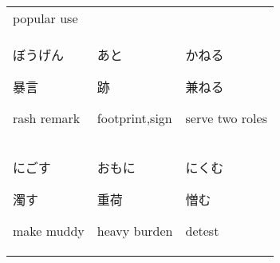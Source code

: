 \documentclass[12pt, a4j, landscape, dvipdfmx]{utarticle}
\begin{document}
\begin{minipage}[t][0pt]{\linewidth }
\begin{tabular}{||p{5.5cm}||p{5.5cm}||p{5.5cm}||}
            {\small popular use}\tabularnewline
            \hhline{|:=::=::=:|} \rule{0pt}{3ex}
            \hspace*{-.4cm} {\LARGE ぼうげん}\newline
            \rule{0pt}{3ex} \hspace*{.4cm} {\small
            暴言}\newline \rule{0pt}{3ex} \hspace*{.425cm}
            {\small rash remark}&\rule{0pt}{3ex}
            \hspace*{-.4cm} {\LARGE あと}\newline
            \rule{0pt}{3ex} \hspace*{.4cm} {\small
            跡}\newline \rule{0pt}{3ex} \hspace*{.425cm}
            {\small footprint,sign}&\rule{0pt}{3ex}
            \hspace*{-.4cm} {\LARGE かねる}\newline
            \rule{0pt}{3ex} \hspace*{.4cm} {\small
            兼ねる}\newline \rule{0pt}{3ex} \hspace*{.425cm}
            {\small serve two roles}\tabularnewline
            \hhline{|:=::=::=:|} \rule{0pt}{3ex}
            \hspace*{-.4cm} {\LARGE にごす}\newline
            \rule{0pt}{3ex} \hspace*{.4cm} {\small
            濁す}\newline \rule{0pt}{3ex} \hspace*{.425cm}
            {\small make muddy}&\rule{0pt}{3ex}
            \hspace*{-.4cm} {\LARGE おもに}\newline
            \rule{0pt}{3ex} \hspace*{.4cm} {\small
            重荷}\newline \rule{0pt}{3ex} \hspace*{.425cm}
            {\small heavy burden}&\rule{0pt}{3ex}
            \hspace*{-.4cm} {\LARGE にくむ}\newline
            \rule{0pt}{3ex} \hspace*{.4cm} {\small
            憎む}\newline \rule{0pt}{3ex} \hspace*{.425cm}
            {\small detest}\tabularnewline

\end{tabular}
\end{minipage}
\end{document}
